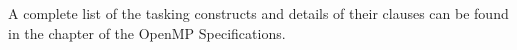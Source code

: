 A complete list of the tasking constructs and details of their clauses
can be found in the  chapter of the OpenMP Specifications.











